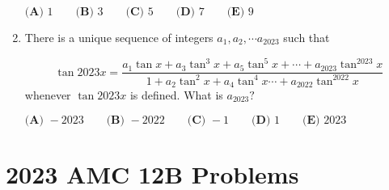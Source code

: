 \documentclass{article}
\begin{document}
\begin{enumerate}[label=\arabic*., itemsep=0.5em]
\(\textbf{(A) } 1 \qquad \textbf{(B) } 3 \qquad \textbf{(C) } 5 \qquad \textbf{(D) } 7 \qquad \textbf{(E) } 9\)\par \vspace{0.5em}\item There is a unique sequence of integers \(a_1, a_2, \cdots a_{2023}\) such that

\begin{equation*}
\tan2023x = \frac{a_1 \tan x + a_3 \tan^3 x + a_5 \tan^5 x + \cdots + a_{2023} \tan^{2023} x}{1 + a_2 \tan^2 x + a_4 \tan^4 x \cdots + a_{2022} \tan^{2022} x}
\end{equation*}
whenever \(\tan 2023x\) is defined. What is \(a_{2023}?\)

\(\textbf{(A) } -2023 \qquad\textbf{(B) } -2022 \qquad\textbf{(C) } -1 \qquad\textbf{(D) } 1 \qquad\textbf{(E) } 2023\)\par \vspace{0.5em}\end{enumerate}\newpage\section*{2023 AMC 12B Problems}
\end{document}
